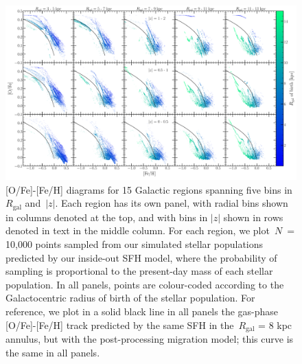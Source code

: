 \documentclass[fleqn, usenatbib]{mnras}
\begin{document}
\begin{figure} 
\centering 
\includegraphics[scale = 0.28]{ofe_feh_densitymap.pdf} 
\caption{[O/Fe]-[Fe/H] diagrams for 15 Galactic regions spanning five bins in 
$R_\text{gal}$ and~$\left|z\right|$. Each region has its own panel, with 
radial bins shown in columns denoted at the top, and with bins in 
$\left|z\right|$ shown in rows denoted in text in the middle column. For each 
region, we plot~$N$~= 10,000 points sampled from our simulated stellar 
populations predicted by our inside-out SFH model, where the probability of 
sampling is proportional to the present-day mass of each stellar population. 
In all panels, points are colour-coded according to the Galactocentric radius 
of birth of the stellar population. For reference, we plot in a solid black 
line in all panels the gas-phase [O/Fe]-[Fe/H] track predicted by the same 
SFH in the~$R_\text{gal}$ = 8 kpc annulus, but with the post-processing 
migration model; this curve is the same in all panels. } 
\label{fig:ofe_feh_diagram} 
\end{figure} 
\end{document}
